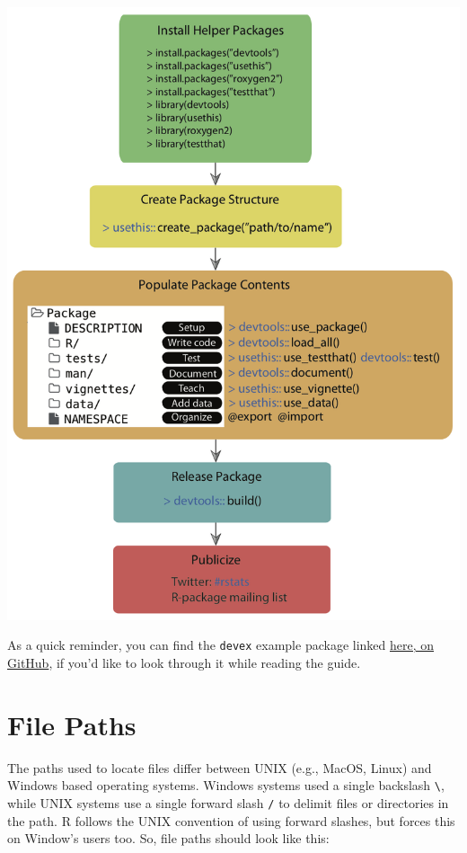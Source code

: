 \documentclass[
]{book}
\begin{document}
\includegraphics{images/package_workflow2.png}

As a quick reminder, you can find the \texttt{devex} example package linked \href{https://github.com/IQSS/Rbuild/tree/master/devex}{here, on GitHub}, if you'd like to look through it while reading the guide.

\hypertarget{file-paths}{%
\section{File Paths}\label{file-paths}}

The paths used to locate files differ between UNIX (e.g., MacOS, Linux) and Windows based operating systems. Windows systems used a single backslash \texttt{\textbackslash{}}, while UNIX systems use a single forward slash \texttt{/} to delimit files or directories in the path. R follows the UNIX convention of using forward slashes, but forces this on Window's users too. So, file paths should look like this:
\end{document}
